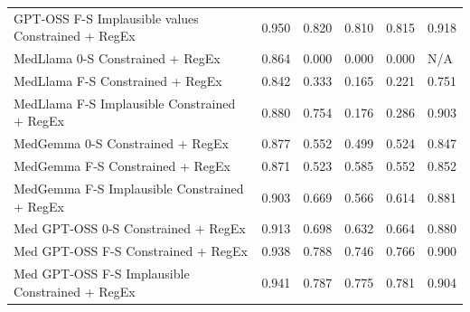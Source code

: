 \begin{tabular}{l|llll|l}
GPT-OSS F-S Implausible values  Constrained + RegEx & 0.950 &   0.820   &   0.810  &   0.815 & 0.918 \\
MedLlama 0-S  Constrained + RegEx & 0.864 & 0.000 & 0.000 & 0.000 & N/A \\
MedLlama F-S  Constrained + RegEx &  0.842 & 0.333  &  0.165 & 0.221  & 0.751 \\
MedLlama F-S Implausible Constrained + RegEx & 0.880 & 0.754 & 0.176 & 0.286 & 0.903 \\
MedGemma 0-S  Constrained + RegEx & 0.877  &   0.552 &   0.499 &   0.524  & 0.847  \\
MedGemma F-S  Constrained + RegEx &  0.871  &   0.523 &  0.585 & 0.552 & 0.852  \\
MedGemma F-S Implausible  Constrained + RegEx & 0.903 & 0.669 & 0.566 & 0.614 & 0.881 \\
Med GPT-OSS 0-S  Constrained + RegEx & 0.913 & 0.698 & 0.632 & 0.664 & 0.880 \\
Med GPT-OSS F-S Constrained + RegEx &  0.938  &   0.788   &  0.746   &  0.766 & 0.900  \\
Med GPT-OSS F-S Implausible  Constrained + RegEx & 0.941 & 0.787 & 0.775 & 0.781 & 0.904 \\
\bottomrule
\end{tabular}